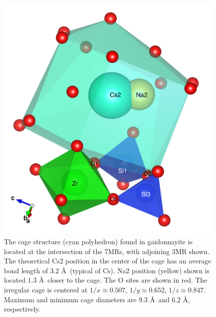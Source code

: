 \documentclass[journal=acsodf,manuscript=article]{achemso}
\begin{document}
\begin{figure}  %
\begin{center}
\includegraphics[width=0.70\columnwidth]{figures/gaidonnayite_cages2_copy_2.png}
\caption{{The cage structure (cyan polyhedron) found in gaidonnayite is located at
the intersection of the 7MRs, with adjoining 3MR shown. The theoretical
Cs2 position in the center of the cage has an average bond length of 3.2
\AA\ (typical of Cs)\cite{Batsanov_2001}. Na2 position (yellow) shown is
located 1.3 \AA\ closer to the cage. The O sites are shown in red. The
irregular cage is centered at  $1/x \approx 0.507$, $1/y \approx 0.652$,
$1/z \approx 0.847$. Maximum and minimum cage diameters are
9.3 \AA\ and 6.2 \AA, respectively.
{\label{fig_cage_view}}%
}}
\end{center}
\end{figure}
\end{document}
